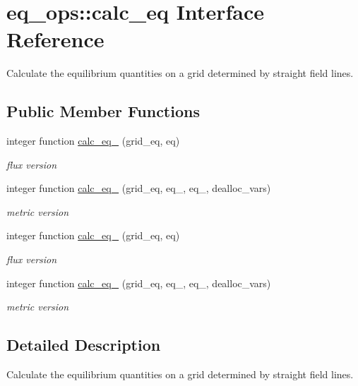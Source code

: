 \hypertarget{interfaceeq__ops_1_1calc__eq}{}\section{eq\+\_\+ops\+:\+:calc\+\_\+eq Interface Reference}
\label{interfaceeq__ops_1_1calc__eq}


Calculate the equilibrium quantities on a grid determined by straight field lines.  


\subsection*{Public Member Functions}
\begin{DoxyCompactItemize}
\item 
integer function \hyperlink{interfaceeq__ops_1_1calc__eq_a8587be1881a2238df0ea9216aaf93555}{calc\+\_\+eq\+\_} (grid\+\_\+eq, eq)
\begin{DoxyCompactList}\small\item\em flux version \end{DoxyCompactList}\item 
integer function \hyperlink{interfaceeq__ops_1_1calc__eq_ae2f56ab19ce5c33e863f32e1c9263604}{calc\+\_\+eq\+\_} (grid\+\_\+eq, eq\+\_, eq\+\_, dealloc\+\_\+vars)
\begin{DoxyCompactList}\small\item\em metric version \end{DoxyCompactList}\item 
integer function \hyperlink{interfaceeq__ops_1_1calc__eq_a8587be1881a2238df0ea9216aaf93555}{calc\+\_\+eq\+\_} (grid\+\_\+eq, eq)
\begin{DoxyCompactList}\small\item\em flux version \end{DoxyCompactList}\item 
integer function \hyperlink{interfaceeq__ops_1_1calc__eq_ae2f56ab19ce5c33e863f32e1c9263604}{calc\+\_\+eq\+\_} (grid\+\_\+eq, eq\+\_, eq\+\_, dealloc\+\_\+vars)
\begin{DoxyCompactList}\small\item\em metric version \end{DoxyCompactList}\end{DoxyCompactItemize}


\subsection{Detailed Description}
Calculate the equilibrium quantities on a grid determined by straight field lines. 


